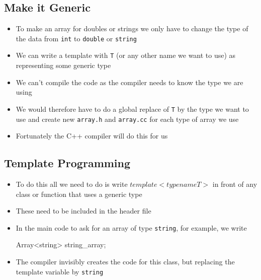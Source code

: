 \begin{slide}
\section{Make it Generic}

\begin{itemize}
\item To make an array for doubles or strings we only have to change
  the type of the data from \texttt{int} to \texttt{double} or
  \texttt{string}
\item We can write a template with \texttt{T} (or any other name we
  want to use) as representing some generic type
\item We can't compile the code as the compiler needs to know the
  type we are using
\item We would therefore have to do a global replace of \texttt{T} by
  the type we want to use and create new \texttt{array.h} and
  \texttt{array.cc} for each type of array we use
\item Fortunately the C++ compiler will do this for us
\end{itemize}

\end{slide}


\begin{slide}
\section{Template Programming}
  
\begin{PauseHighLight}
  \begin{itemize}
  \item To do this all we need to do is write
    \jl$template <typename T>$ in front of any class or function that
    uses a generic type
  \item These need to be included in the header file
  \item In the main code to ask for an array of type \texttt{string},
    for example, we write
    \begin{cpp}
      Array<string> string_array;
    \end{cpp}
  \item The compiler invisibly creates the code for this class, but
    replacing the template variable by \texttt{string}
  \end{itemize}
\end{PauseHighLight}

\end{slide}

